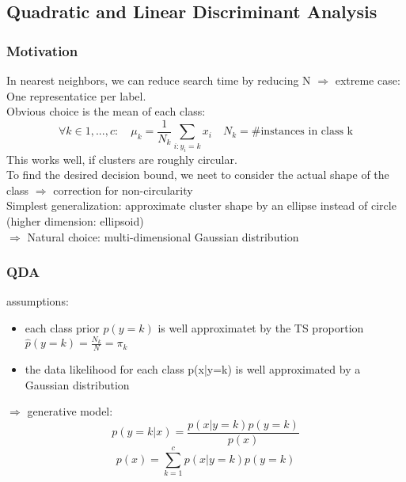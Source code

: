 \documentclass[11pt]{article}
\begin{document}
    \subsection{Quadratic and Linear Discriminant Analysis}
      \subsubsection{Motivation}
        In nearest neighbors, we can reduce search time by reducing N
        $\Rightarrow$ extreme case: One representatice per label. \\
        Obvious choice is the mean of each class:
        \begin{equation*}
          \forall k \in 1,...,c: \quad \mu_k = \frac{1}{N_k} \sum_{i:y_i=k}x_i
          \quad N_k = \text{#instances in class k}
        \end{equation*}
        This works well, if clusters are roughly circular. \\
        To find the desired decision bound, we neet to consider the
        actual shape of the class $\Rightarrow$ correction for non-circularity \\
        Simplest generalization: approximate cluster shape by an ellipse instead
        of circle (higher dimension: ellipsoid) \\
        $\Rightarrow$ Natural choice: multi-dimensional Gaussian distribution
      \subsubsection{QDA}
        assumptions:
        \begin{itemize}
          \item each class prior $p(y=k)$ is well approximatet by the TS
          proportion $\hat{p}(y=k)=\frac{N_k}{N}=\pi_k$
          \item the data likelihood for each class p(x|y=k) is well approximated
          by a Gaussian distribution
        \end{itemize}
        $\Rightarrow$ generative model:
        \begin{equation*}
           p(y=k|x) = \frac{p(x|y=k)p(y=k)}{p(x)}
        \end{equation*}
        \begin{equation*}
          p(x) = \sum_{k=1}^{c}p(x|y=k)p(y=k)
        \end{equation*}
\end{document}
